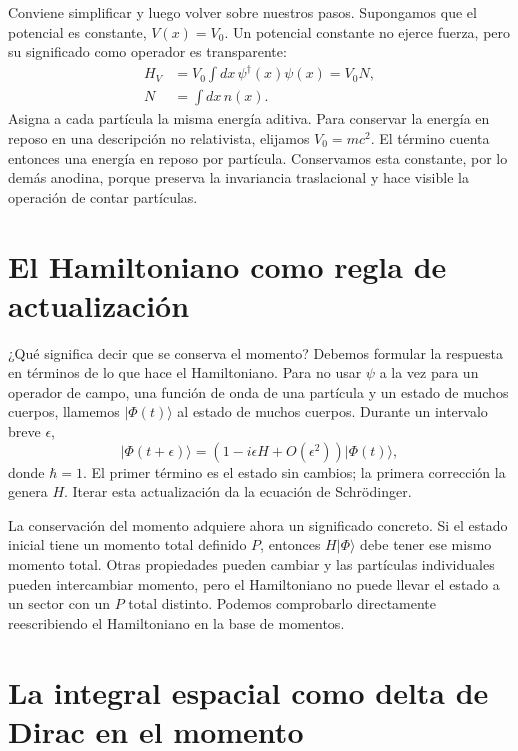 Conviene simplificar y luego volver sobre nuestros pasos. Supongamos que el potencial es constante, \(V(x)=V_0\). Un potencial constante no ejerce fuerza, pero su significado como operador es transparente:
\begin{equation}
\begin{aligned}
H_V&=V_0\int dx\,\psi^\dagger(x)\psi(x)=V_0N,\\
N&=\int dx\,n(x).
\end{aligned}
\end{equation}
Asigna a cada partícula la misma energía aditiva. Para conservar la energía en reposo en una descripción no relativista, elijamos \(V_0=mc^2\). El término cuenta entonces una energía en reposo por partícula. Conservamos esta constante, por lo demás anodina, porque preserva la invariancia traslacional y hace visible la operación de contar partículas.

\section{El Hamiltoniano como regla de actualización}

¿Qué significa decir que se conserva el momento? Debemos formular la respuesta en términos de lo que hace el Hamiltoniano. Para no usar \(\psi\) a la vez para un operador de campo, una función de onda de una partícula y un estado de muchos cuerpos, llamemos \(\lvert\Phi(t)\rangle\) al estado de muchos cuerpos. Durante un intervalo breve \(\epsilon\),
\begin{equation}
\lvert\Phi(t+\epsilon)\rangle
=\left(1-i\epsilon H+O(\epsilon^2)\right)
\lvert\Phi(t)\rangle,
\label{eq:l9-short-update}
\end{equation}
donde \(\hbar=1\). El primer término es el estado sin cambios; la primera corrección la genera \(H\). Iterar esta actualización da la ecuación de Schr\"odinger.

La conservación del momento adquiere ahora un significado concreto. Si el estado inicial tiene un momento total definido \(P\), entonces \(H\lvert\Phi\rangle\) debe tener ese mismo momento total. Otras propiedades pueden cambiar y las partículas individuales pueden intercambiar momento, pero el Hamiltoniano no puede llevar el estado a un sector con un \(P\) total distinto. Podemos comprobarlo directamente reescribiendo el Hamiltoniano en la base de momentos.

\section{La integral espacial como delta de Dirac en el momento}

